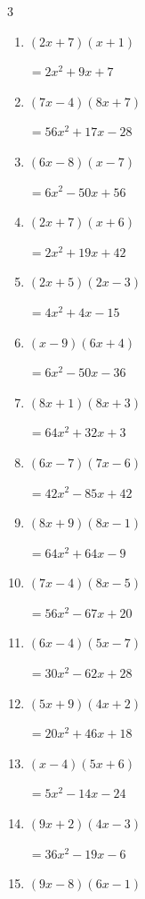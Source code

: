 \begin{multicols}{3}
\begin{enumerate}
        $=32x^{2}-40x-48$

\columnbreak %

\resetques

  \item $(2x+7)(x+1)$

        $=2x^{2}+9x+7$

  \item $(7x-4)(8x+7)$

        $=56x^{2}+17x-28$

  \item $(6x-8)(x-7)$

        $=6x^{2}-50x+56$

  \item $(2x+7)(x+6)$

        $=2x^{2}+19x+42$

  \item $(2x+5)(2x-3)$

        $=4x^{2}+4x-15$

  \item $(x-9)(6x+4)$

        $=6x^{2}-50x-36$

  \item $(8x+1)(8x+3)$

        $=64x^{2}+32x+3$

  \item $(6x-7)(7x-6)$

        $=42x^{2}-85x+42$

  \item $(8x+9)(8x-1)$

        $=64x^{2}+64x-9$

  \item $(7x-4)(8x-5)$

        $=56x^{2}-67x+20$

  \item $(6x-4)(5x-7)$

        $=30x^{2}-62x+28$

  \item $(5x+9)(4x+2)$

        $=20x^{2}+46x+18$

  \item $(x-4)(5x+6)$

        $=5x^{2}-14x-24$

  \item $(9x+2)(4x-3)$

        $=36x^{2}-19x-6$

  \item $(9x-8)(6x-1)$


\end{enumerate}
\end{multicols}
